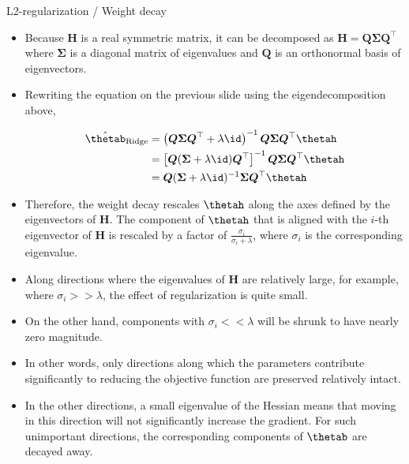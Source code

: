 \begin{vbframe}{L2-regularization / Weight decay}
\begin{itemize}
\item Because $\bm{H}$ is a real symmetric matrix, it can be decomposed as $\bm{H} = \bm{Q} \bm{\Sigma} \bm{Q}^\top$ where $\bm{\Sigma}$ is a diagonal matrix of eigenvalues and $\bm{Q}$ is an orthonormal basis of eigenvectors.
\item Rewriting the equation on the previous slide using the eigendecomposition above,

\begin{equation*}
\begin{aligned} 
\hat{\thetab}_{\text{Ridge}} &=\left(\bm{Q} \bm{\Sigma} \bm{Q}^{\top}+\lambda \id\right)^{-1} \bm{Q} \bm{\Sigma} \bm{Q}^{\top} \thetah \\ 
              &=\left[\bm{Q}(\bm{\Sigma}+\lambda \id) \bm{Q}^{\top}\right]^{-1} \bm{Q} \bm{\Sigma} \bm{Q}^{\top} \thetah \\ 
              &=\bm{Q}(\bm{\Sigma} + \lambda \id)^{-1} \bm{\Sigma} \bm{Q}^{\top} \thetah 
\end{aligned}
\end{equation*}
\item Therefore, the weight decay rescales $\thetah$ along the axes defined by the eigenvectors of $\bm{H}$. The component of $\thetah$ that is aligned with the $i$-th eigenvector of $\bm{H}$ is rescaled by a factor of $\frac{\sigma_i}{\sigma_i + \lambda}$, where $\sigma_i$ is the corresponding eigenvalue.
\framebreak

  \item Along directions where the eigenvalues of $\bm{H}$ are relatively large, for example, where $\sigma_i >> \lambda$, the effect of regularization is quite small.
  \item On the other hand, components with $\sigma_i << \lambda$ will be shrunk to have nearly zero magnitude.
  \item In other words, only directions along which the parameters contribute significantly to reducing the objective function are preserved relatively intact.
  \item In the other directions, a small eigenvalue of the Hessian means that moving in this direction will not significantly increase the gradient. For such unimportant directions, the corresponding components of $\thetab$ are decayed away.
  \end{itemize}
\framebreak


\end{vbframe}
